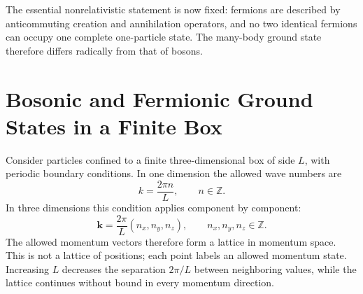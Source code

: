 \begin{classroomqa}
\end{classroomqa}

\begin{classroomqa}
\end{classroomqa}

The essential nonrelativistic statement is now fixed: fermions are described by anticommuting creation and annihilation operators, and no two identical fermions can occupy one complete one-particle state. The many-body ground state therefore differs radically from that of bosons.

\section{Bosonic and Fermionic Ground States in a Finite Box}

Consider particles confined to a finite three-dimensional box of side \(L\), with periodic boundary conditions. In one dimension the allowed wave numbers are
\begin{equation}
k=\frac{2\pi n}{L},
\qquad n\in\mathbb{Z}.
\end{equation}
In three dimensions this condition applies component by component:
\begin{equation}
\mathbf{k}=\frac{2\pi}{L}(n_x,n_y,n_z),
\qquad n_x,n_y,n_z\in\mathbb{Z}.
\end{equation}
The allowed momentum vectors therefore form a lattice in momentum space. This is not a lattice of positions; each point labels an allowed momentum state. Increasing \(L\) decreases the separation \(2\pi/L\) between neighboring values, while the lattice continues without bound in every momentum direction.

